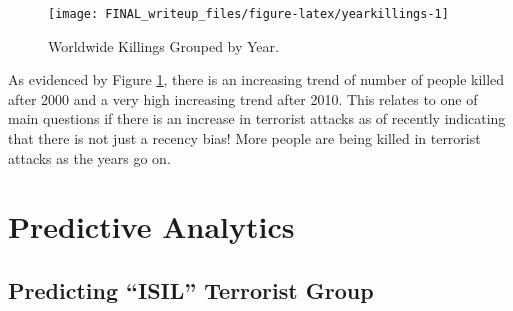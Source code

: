 \documentclass[11pt,letterpaper,]{article}
\newenvironment{Shaded}{\begin{snugshade}}{\end{snugshade}}
\newcommand{\KeywordTok}[1]{\textcolor[rgb]{0.13,0.29,0.53}{\textbf{{#1}}}}
\newcommand{\DataTypeTok}[1]{\textcolor[rgb]{0.13,0.29,0.53}{{#1}}}
\newcommand{\DecValTok}[1]{\textcolor[rgb]{0.00,0.00,0.81}{{#1}}}
\newcommand{\StringTok}[1]{\textcolor[rgb]{0.31,0.60,0.02}{{#1}}}
\newcommand{\NormalTok}[1]{{#1}}
\theoremstyle{definition}
\theoremstyle{definition}
\theoremstyle{definition}
\theoremstyle{remark}
\begin{document}
\begin{Shaded}
\end{Shaded}

\begin{figure}

{\centering \texttt{[image: FINAL\_writeup\_files/figure-latex/yearkillings-1]} 

}

\caption{Worldwide Killings Grouped by Year.}\label{fig:yearkillings}
\end{figure}

As evidenced by Figure \ref{fig:yearkillings}, there is an increasing
trend of number of people killed after 2000 and a very high increasing
trend after 2010. This relates to one of main questions if there is an
increase in terrorist attacks as of recently indicating that there is
not just a recency bias! More people are being killed in terrorist
attacks as the years go on.

\section{Predictive Analytics}\label{predictive-analytics}

\subsection{\texorpdfstring{Predicting ``ISIL'' Terrorist
Group}{Predicting ISIL Terrorist Group}}\label{predicting-isil-terrorist-group}
\end{document}
